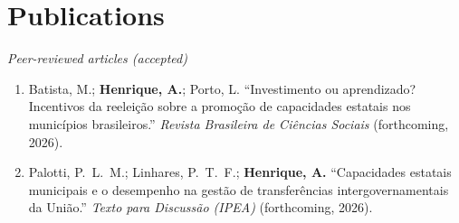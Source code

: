 \documentclass[11pt]{article}
\newcommand{\cvsubsection}[1]{\vspace{0.3em}\textit{#1}\par\vspace{0.1em}}
\begin{document}
\section{Publications}
\cvsubsection{Peer-reviewed articles (accepted)}
\begin{enumerate}[leftmargin=0.3in,itemsep=0.35em,parsep=0pt]
\item Batista, M.; \textbf{Henrique, A.}; Porto, L. ``Investimento ou aprendizado? Incentivos da reeleição sobre a promoção de capacidades estatais nos municípios brasileiros.'' \textit{Revista Brasileira de Ciências Sociais} (forthcoming, 2026).
\item Palotti, P.\ L.\ M.; Linhares, P.\ T.\ F.; \textbf{Henrique, A.} ``Capacidades estatais municipais e o desempenho na gestão de transferências intergovernamentais da União.'' \textit{Texto para Discussão (IPEA)} (forthcoming, 2026).
\end{enumerate}
\end{document}

